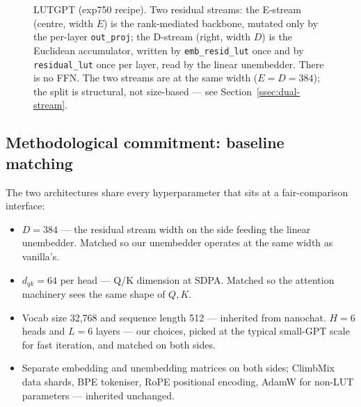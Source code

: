 \documentclass[11pt]{article}
\newcommand{\dqk}{d_{qk}}
\begin{document}
\begin{figure}[!ht]
{%
}%
\caption{LUTGPT (exp750 recipe). Two residual streams: the E-stream (centre, width $E$) is the rank-mediated backbone, mutated only by the per-layer \texttt{out\_proj}; the D-stream (right, width $D$) is the Euclidean accumulator, written by \texttt{emb\_resid\_lut} once and by \texttt{residual\_lut} once per layer, read by the linear unembedder. There is no FFN. The two streams are at the same width ($E = D = 384$); the split is structural, not size-based --- see Section~\ref{ssec:dual-stream}.}
\label{fig:lutgpt}
\end{figure}

\subsection{Methodological commitment: baseline matching}
\label{ssec:matching}

The two architectures share every hyperparameter that sits at a fair-comparison interface:

\begin{itemize}[leftmargin=*,topsep=2pt,itemsep=1pt]
\item $D = 384$ --- the residual stream width on the side feeding the linear unembedder. Matched so our unembedder operates at the same width as vanilla's.
\item $\dqk = 64$ per head --- Q/K dimension at SDPA. Matched so the attention machinery sees the same shape of $Q, K$.
\item Vocab size 32{,}768 and sequence length 512 --- inherited from nanochat. $H = 6$ heads and $L = 6$ layers --- our choices, picked at the typical small-GPT scale for fast iteration, and matched on both sides.
\item Separate embedding and unembedding matrices on both sides; ClimbMix data shards, BPE tokeniser, RoPE positional encoding, AdamW for non-LUT parameters --- inherited unchanged.
\end{itemize}
\end{document}
